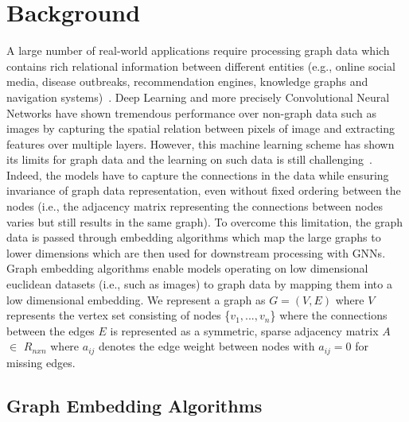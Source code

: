\section{Background}\label{background}

A large number of real-world applications require processing graph data which contains rich relational information between different entities (e.g., online social media, disease outbreaks, recommendation engines, knowledge graphs and navigation systems)~\cite{zhou2018graph}.
Deep Learning and more precisely Convolutional Neural Networks have shown tremendous performance over non-graph data such as images by capturing the spatial relation between pixels of image and extracting features over multiple layers.
However, this machine learning scheme has shown its limits for graph data and the learning on such data is still challenging~\cite{zhou2018graph}.
Indeed, the models have to capture the connections in the data while ensuring invariance of graph data representation, even without fixed ordering between the nodes (i.e., the adjacency matrix representing the connections between nodes varies but still results in the same graph). %
To overcome this limitation, the graph data is passed through embedding algorithms which map the large graphs to lower dimensions which are then used for downstream processing with GNNs.
Graph embedding algorithms enable models operating on low dimensional euclidean datasets (i.e., such as images) to graph data by mapping them into a low dimensional embedding.
We represent a graph as $G=(V,E)$ where $V$ represents the vertex set consisting of nodes \{$v_1,...,v_n$\} where the connections between the edges $E$ is represented as a symmetric, sparse adjacency matrix $A$ $\in$ $R_{nxn}$ where $a_{ij}$ denotes the edge weight between nodes with $a_{ij}= 0$ for missing edges.


\subsection{Graph Embedding Algorithms}

